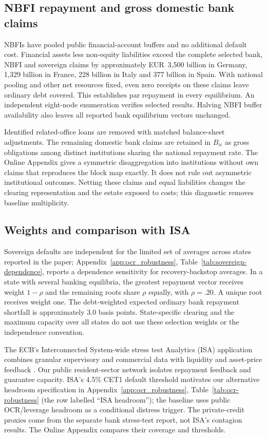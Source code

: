 \subsection{NBFI repayment and gross domestic bank claims}

NBFIs have pooled public financial-account buffers and no additional default cost. Financial assets less non-equity liabilities exceed the complete selected bank, NBFI and sovereign claims by approximately EUR~3,500 billion in Germany, 1,329 billion in France, 228 billion in Italy and 377 billion in Spain. With national pooling and other net resources fixed, even zero receipts on these claims leave ordinary debt covered. This establishes par repayment in every equilibrium. An independent eight-node enumeration verifies selected results. Halving NBFI buffer availability also leaves all reported bank equilibrium vectors unchanged.

Identified related-office loans are removed with matched balance-sheet adjustments. The remaining domestic bank claims are retained in $B_{ii}$ as gross obligations among distinct institutions sharing the national repayment rate. The Online Appendix gives a symmetric disaggregation into institutions without own claims that reproduces the block map exactly. It does not rule out asymmetric institutional outcomes. Netting these claims and equal liabilities changes the clearing representation and the estate exposed to costs; this diagnostic removes baseline multiplicity.

\subsection{Weights and comparison with ISA}

Sovereign defaults are independent for the limited set of averages across states reported in the paper; Appendix~\ref{app:ocr_robustness}, Table~\ref{tab:sovereign-dependence}, reports a dependence sensitivity for recovery-backstop averages. In a state with several banking equilibria, the greatest repayment vector receives weight $1-\rho$ and the remaining roots share $\rho$ equally, with $\rho=.20$. A unique root receives weight one. The debt-weighted expected ordinary bank repayment shortfall is approximately 3.0 basis points. State-specific clearing and the maximum capacity over all states do not use these selection weights or the independence convention.

The ECB's Interconnected System-wide stress test Analytics (ISA) application combines granular supervisory and commercial data with liquidity and asset-price feedback \citep{GrassiEtAl2025}. Our public resident-sector network isolates repayment feedback and guarantee capacity. ISA's 4.5\% CET1 default threshold motivates our alternative headroom specification in Appendix~\ref{app:ocr_robustness}, Table~\ref{tab:ocr-robustness} (the row labelled ``ISA headroom''); the baseline uses public OCR/leverage headroom as a conditional distress trigger. The private-credit proxies come from the separate bank stress-test report, not ISA's contagion results. The Online Appendix compares their coverage and thresholds.
